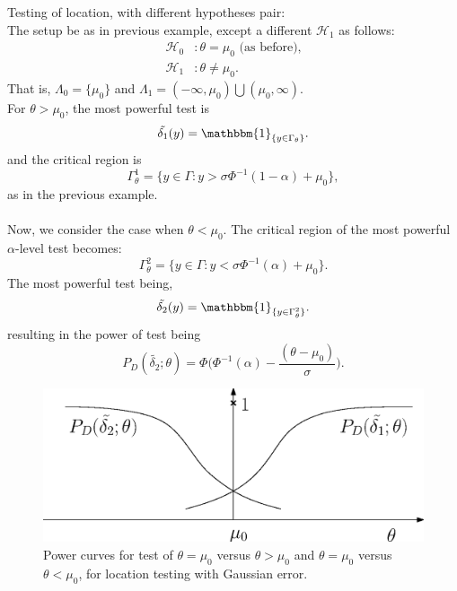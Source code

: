 \documentclass[a4paper,english,12pt]{article}
\begin{document}
\begin{exmp}{Testing of location, with different hypotheses pair:}\\
The setup be as in previous example, except a different $\mathcal{H}_1$ as follows:
\begin{align*}
\mathcal{H}_0 &: \theta = \mu_0  \text{   (as before),}\\
\mathcal{H}_1 &: \theta \neq \mu_0.
\end{align*}
That is, $\Lambda_0 = \{\mu_0\}$ and $\Lambda_1 = (-\infty, \mu_0) \bigcup (\mu_0, \infty)$.\\
For $\theta > \mu_0$, the most powerful test is
\begin{equation}
\tilde{\delta_1}(y) = \mathbbm{1}_{\{y \in \Gamma_\theta\}}.
\end{equation}
and the critical region is
\begin{equation}
\Gamma_\theta^1 = \{y \in \Gamma: y > \sigma\Phi^{-1}(1 - \alpha) + \mu_0\},
\end{equation}
as in the previous example.\\\\
Now, we consider the case when $\theta < \mu_0$. The critical region of the most powerful $\alpha$-level test becomes:
\begin{equation}
\Gamma_\theta^2 = \{y \in \Gamma: y < \sigma\Phi^{-1}(\alpha) + \mu_0\}.
\end{equation}
The most powerful test being,
\begin{equation}
\tilde{\delta_2}(y) = \mathbbm{1}_{\{y \in \Gamma_\theta^2\}}.
\end{equation}
resulting in the power of test being
\begin{equation}
P_D(\tilde{\delta_2}; \theta) = \Phi\Big(\Phi^{-1}(\alpha) - \dfrac{(\theta - \mu_0)}{\sigma}\Big).
\end{equation}
\begin{figure}
\centering
\includegraphics[scale=0.6]{Figures/PD.eps}
\caption{Power curves for test of $\theta = \mu_0$ versus $\theta > \mu_0$ and $\theta = \mu_0$ versus $\theta < \mu_0$, for location testing with Gaussian error.}
\label{fig: example 1.5 and 1.6}
\end{figure}
\end{exmp}
\end{document}
